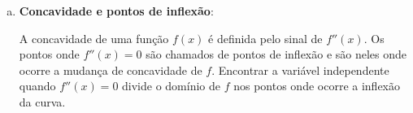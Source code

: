 \begin{enumerate}[a.]
	\item \textbf{Concavidade e pontos de inflexão}:
	
	A concavidade de uma função $f(x)$ é definida pelo sinal de $f''(x)$. Os pontos onde $f''(x) = 0$ são chamados de pontos de inflexão e são neles onde ocorre a mudança de concavidade de $f$. Encontrar a variável independente quando $f''(x) = 0$ divide o domínio de $f$ nos pontos onde ocorre a inflexão da curva.

\end{enumerate}